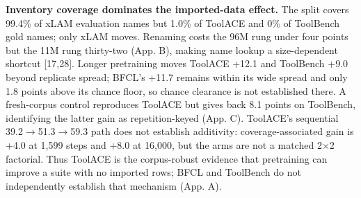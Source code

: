 \documentclass{article}
\begin{document}
\textbf{Inventory coverage dominates the imported-data effect.} The split covers 99.4\% of xLAM
evaluation names but 1.0\% of ToolACE and 0\% of ToolBench gold names; only xLAM moves. Renaming
costs the 96M rung under four points but the 11M rung thirty-two (App. B), making name lookup a
size-dependent shortcut [17,28]. Longer pretraining moves ToolACE +12.1 and ToolBench +9.0
beyond replicate spread; BFCL's +11.7 remains within its wide spread and only 1.8 points above
its chance floor, so chance clearance is not established there. A fresh-corpus control reproduces
ToolACE but gives back 8.1 points on ToolBench, identifying the latter gain as repetition-keyed
(App. C). ToolACE's sequential 39.2$\rightarrow$51.3$\rightarrow$59.3 path does not establish
additivity: coverage-associated gain is +4.0 at 1,599 steps and +8.0 at 16,000, but the arms are
not a matched 2$\times$2 factorial. Thus ToolACE is the corpus-robust evidence that pretraining can
improve a suite with no imported rows; BFCL and ToolBench do not independently establish that
mechanism (App. A).
\end{document}
